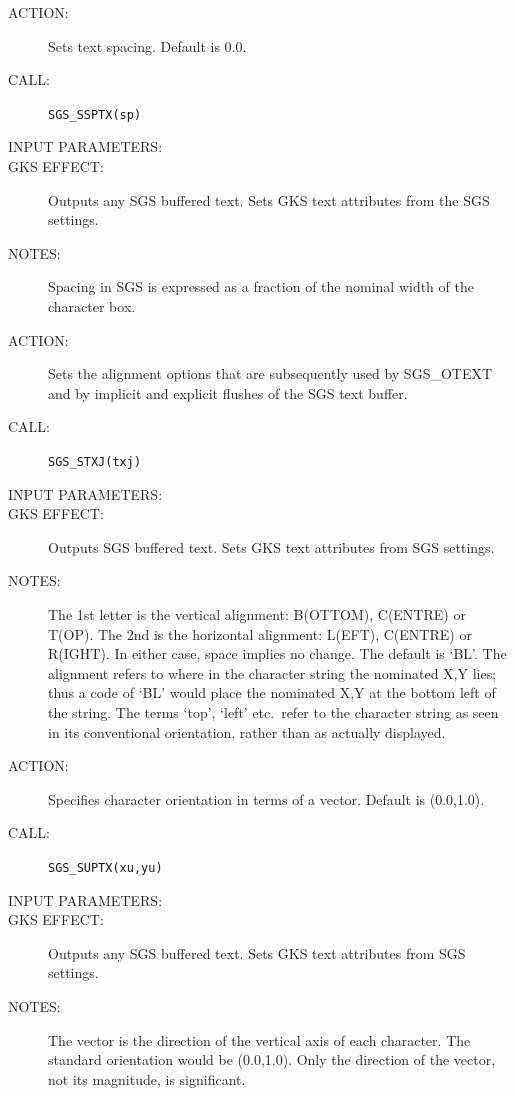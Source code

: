 \documentclass[11pt]{article}
\begin{document}
\begin{description}
\item [ACTION:]
Sets text spacing.
Default is 0.0.
\item [CALL:]
{\tt SGS\_SSPTX(sp)}
\item [INPUT PARAMETERS:]
\begin{params}
\end{params}
\item [GKS EFFECT:]
Outputs any SGS buffered text.
Sets GKS text attributes from the SGS settings.
\item [NOTES:]
Spacing in SGS is expressed as a fraction of the nominal width of the character
box.
\end{description}
\goodbreak

\begin{description}
\item [ACTION:]
Sets the alignment options that are subsequently used by SGS\_OTEXT
and by implicit and explicit flushes of the SGS text buffer.
\item [CALL:]
{\tt SGS\_STXJ(txj)}
\item [INPUT PARAMETERS:]
\begin{params}
\end{params}
\item [GKS EFFECT:]
Outputs SGS buffered text.
Sets GKS text attributes from SGS settings.
\item [NOTES:]
The 1st letter is the vertical alignment: B(OTTOM), C(ENTRE) or T(OP).
The 2nd is the horizontal alignment: L(EFT), C(ENTRE) or R(IGHT).
In either case, space implies no change.
The default is `BL'.
The alignment refers to where in the character string the nominated X,Y lies;
thus a code of `BL' would place the nominated X,Y at the bottom left of the
string.
The terms `top', `left' etc.\ refer to the character string as seen in its
conventional orientation, rather than as actually displayed.
\end{description}
\goodbreak

\begin{description}
\item [ACTION:]
Specifies character orientation in terms of a vector.
Default is (0.0,1.0).
\item [CALL:]
{\tt SGS\_SUPTX(xu,yu)}
\item [INPUT PARAMETERS:]
\begin{params}
\end{params}
\item [GKS EFFECT:]
Outputs any SGS buffered text.
Sets GKS text attributes from SGS settings.
\item [NOTES:]
The vector is the direction of the vertical axis of each character.
The standard orientation would be (0.0,1.0).
Only the direction of the vector, not its magnitude, is significant.
\end{description}
\goodbreak
\end{document}
